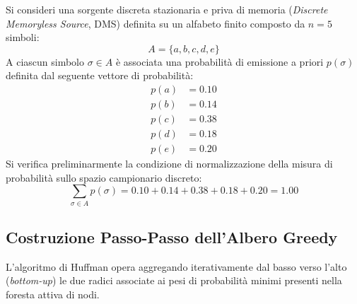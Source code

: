 Si consideri una sorgente discreta stazionaria e priva di memoria (\textit{Discrete Memoryless Source}, DMS) definita su un alfabeto finito composto da $n = 5$ simboli:
\begin{equation}
  A = \{a, b, c, d, e\}
\end{equation}
A ciascun simbolo $\sigma \in A$ \`e associata una probabilit\`a di emissione a priori $p(\sigma)$ definita dal seguente vettore di probabilit\`a:
\begin{align}
  p(a) &= 0.10 \label{eq:prob-a} \\
  p(b) &= 0.14 \label{eq:prob-b} \\
  p(c) &= 0.38 \label{eq:prob-c} \\
  p(d) &= 0.18 \label{eq:prob-d} \\
  p(e) &= 0.20 \label{eq:prob-e}
\end{align}
Si verifica preliminarmente la condizione di normalizzazione della misura di probabilit\`a sullo spazio campionario discreto:
\begin{equation}
  \sum_{\sigma \in A} p(\sigma) = 0.10 + 0.14 + 0.38 + 0.18 + 0.20 = 1.00
\end{equation}

\FloatBarrier
\subsection{Costruzione Passo-Passo dell'Albero Greedy}
\label{subsec:costruzione-greedy-huffman}

L'algoritmo di Huffman opera aggregando iterativamente dal basso verso l'alto (\textit{bottom-up}) le due radici associate ai pesi di probabilit\`a minimi presenti nella foresta attiva di nodi.

